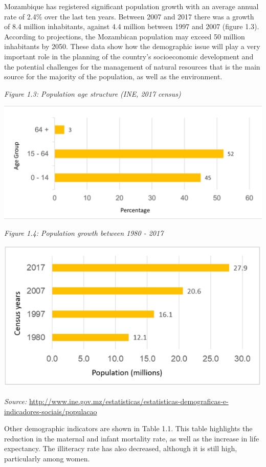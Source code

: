 \documentclass[
]{book}
\begin{document}
Mozambique has registered significant population growth with an average annual rate of 2.4\% over the last ten years. Between 2007 and 2017 there was a growth of 8.4 million inhabitants, against 4.4 million between 1997 and 2007 (figure 1.3). According to projections, the Mozambican population may exceed 50 million inhabitants by 2050. These data show how the demographic issue will play a very important role in the planning of the country's socioeconomic development and the potential challenges for the management of natural resources that is the main source for the majority of the population, as well as the environment.

\emph{Figure 1.3: Population age structure (INE, 2017 census)}

\includegraphics{Figure4.png}

\emph{Figure 1.4: Population growth between 1980 - 2017}

\includegraphics{Figure5.png}

\emph{Source:} \url{http://www.ine.gov.mz/estatisticas/estatisticas-demograficas-e-indicadores-sociais/populacao}

Other demographic indicators are shown in Table 1.1. This table highlights the reduction in the maternal and infant mortality rate, as well as the increase in life expectancy. The illiteracy rate has also decreased, although it is still high, particularly among women.
\end{document}
